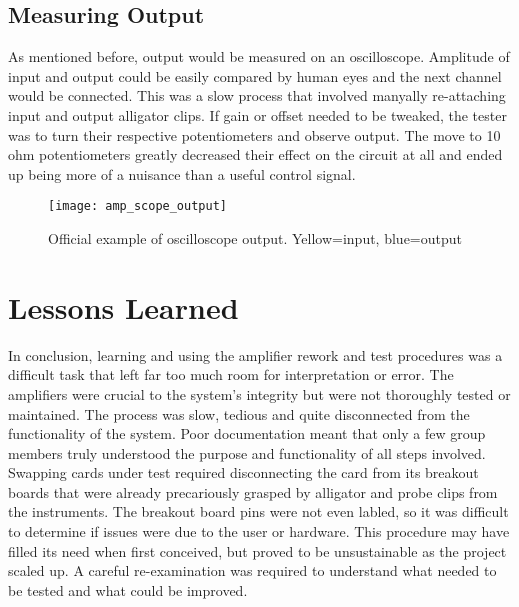 \subsection{Measuring Output}
As mentioned before, output would be measured on an oscilloscope. Amplitude of input and output could be easily compared by human eyes and the next channel would be connected. This was a slow process that involved manyally re-attaching input and output alligator clips. If gain or offset needed to be tweaked, the tester was to turn their respective potentiometers and observe output. The move to 10 ohm potentiometers greatly decreased their effect on the circuit at all and ended up being more of a nuisance than a useful control signal. 
\begin{figure}[!htb]
	\centering
	\texttt{[image: amp\_scope\_output]}
	\caption{Official example of oscilloscope output. Yellow=input, blue=output}
\end{figure}
\section{Lessons Learned}
In conclusion, learning and using the amplifier rework and test procedures was a difficult task that left far too much room for interpretation or error. The amplifiers were crucial to the system's integrity but were not thoroughly tested or maintained. The process was slow, tedious and quite disconnected from the functionality of the system. Poor documentation meant that only a few group members truly understood the purpose and functionality of all steps involved. Swapping cards under test required disconnecting the card from its breakout boards that were already precariously grasped by alligator and probe clips from the instruments. The breakout board pins were not even labled, so it was difficult to determine if issues were due to the user or hardware. This procedure may have filled its need when first conceived, but proved to be unsustainable as the project scaled up. A careful re-examination was required to understand what needed to be tested and what could be improved.
